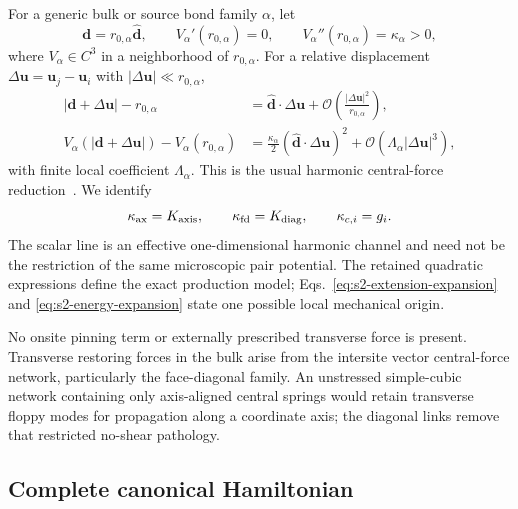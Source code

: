 \documentclass[10pt,aps,pre,reprint,floatfix,notitlepage,nofootinbib]{revtex4-2}
\newcommand{\vu}{\bm{u}}
\newcommand{\vd}{\bm{d}}
\newcommand{\order}{\mathcal O}
\begin{document}
For a generic bulk or source bond family $\alpha$, let
\begin{equation}
  \vd=r_{0,\alpha}\hat{\vd},
  \qquad
  V_\alpha'(r_{0,\alpha})=0,
  \qquad
  V_\alpha''(r_{0,\alpha})=\kappa_\alpha>0,
  \label{eq:s2-central-assumptions}
\end{equation}
where $V_\alpha\in C^3$ in a neighborhood of $r_{0,\alpha}$. For a relative displacement $\Delta\vu=\vu_j-\vu_i$ with $|\Delta\vu|\ll r_{0,\alpha}$,
\begin{align}
  |\vd+\Delta\vu|-r_{0,\alpha}
  &=\hat{\vd}\cdot\Delta\vu
    +\order\!\left(\frac{|\Delta\vu|^2}{r_{0,\alpha}}\right),
  \label{eq:s2-extension-expansion}\\
  V_\alpha(|\vd+\Delta\vu|)-V_\alpha(r_{0,\alpha})
  &=\frac{\kappa_\alpha}{2}
    (\hat{\vd}\cdot\Delta\vu)^2
    +\order(\Lambda_\alpha|\Delta\vu|^3),
  \label{eq:s2-energy-expansion}
\end{align}
with finite local coefficient $\Lambda_\alpha$. This is the usual harmonic central-force reduction~\cite{BornHuang1954,Maradudin1971}. We identify
\begin{equation}
  \kappa_{\rm ax}=K_{\rm axis},
  \qquad
  \kappa_{\rm fd}=K_{\rm diag},
  \qquad
  \kappa_{c,i}=g_i.
  \label{eq:s2-stiffness-map}
\end{equation}
The scalar line is an effective one-dimensional harmonic channel and need not be the restriction of the same microscopic pair potential. The retained quadratic expressions define the exact production model; Eqs.~\eqref{eq:s2-extension-expansion} and \eqref{eq:s2-energy-expansion} state one possible local mechanical origin.

No onsite pinning term or externally prescribed transverse force is present. Transverse restoring forces in the bulk arise from the intersite vector central-force network, particularly the face-diagonal family. An unstressed simple-cubic network containing only axis-aligned central springs would retain transverse floppy modes for propagation along a coordinate axis; the diagonal links remove that restricted no-shear pathology.

\subsection{Complete canonical Hamiltonian}
\label{sec:s2-hamiltonian}
\end{document}

